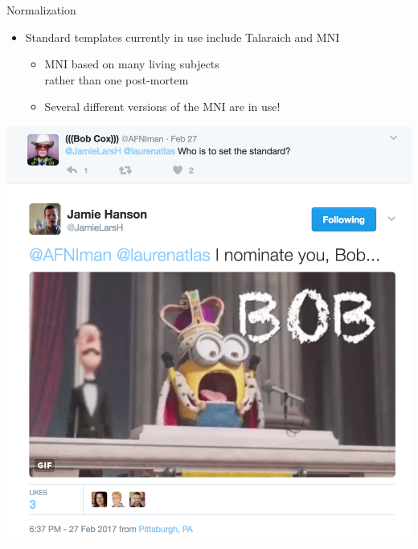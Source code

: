 \documentclass[t,12pt]{beamer}
\begin{document}
\begin{frame}{Normalization}
\vspace{10pt}
\begin{minipage}{.49\textwidth}
\begin{itemize}
\setlength\itemsep{1em}
\item Standard templates currently in use include Talaraich and MNI
\vspace{4pt}
\begin{itemize}
\setlength\itemsep{0.5em}
\item MNI based on many living subjects \\ rather than one post-mortem
\item Several different versions of the MNI are in use!
\end{itemize}
\end{itemize}
\end{minipage}
\begin{minipage}{.49\textwidth}
\includegraphics[width=\textwidth]{images/king_bob.png} \\
\end{minipage}
\end{frame}
\end{document}
